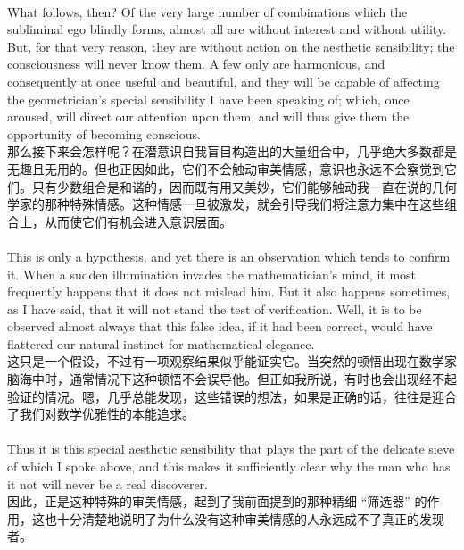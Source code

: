 \documentclass{article}
\begin{document}
\\
What follows, then? Of the very large number of combinations which the subliminal ego blindly forms, almost all are without interest and without utility. But, for that very reason, they are without action on the aesthetic sensibility; the consciousness will never know them. A few only are harmonious, and consequently at once useful and beautiful, and they will be capable of affecting the geometrician’s special sensibility I have been speaking of; which, once aroused, will direct our attention upon them, and will thus give them the opportunity of becoming conscious.\\
那么接下来会怎样呢？在潜意识自我盲目构造出的大量组合中，几乎绝大多数都是无趣且无用的。但也正因如此，它们不会触动审美情感，意识也永远不会察觉到它们。只有少数组合是和谐的，因而既有用又美妙，它们能够触动我一直在说的几何学家的那种特殊情感。这种情感一旦被激发，就会引导我们将注意力集中在这些组合上，从而使它们有机会进入意识层面。\\ 

\\
This is only a hypothesis, and yet there is an observation which tends to confirm it. When a sudden illumination invades the mathematician’s mind, it most frequently happens that it does not mislead him. But it also happens sometimes, as I have said, that it will not stand the test of verification. Well, it is to be observed almost always that this false idea, if it had been correct, would have flattered our natural instinct for mathematical elegance.\\
这只是一个假设，不过有一项观察结果似乎能证实它。当突然的顿悟出现在数学家脑海中时，通常情况下这种顿悟不会误导他。但正如我所说，有时也会出现经不起验证的情况。嗯，几乎总能发现，这些错误的想法，如果是正确的话，往往是迎合了我们对数学优雅性的本能追求。 \\ 

\\
Thus it is this special aesthetic sensibility that plays the part of the delicate sieve of which I spoke above, and this makes it sufficiently clear why the man who has it not will never be a real discoverer.\\
因此，正是这种特殊的审美情感，起到了我前面提到的那种精细 “筛选器” 的作用，这也十分清楚地说明了为什么没有这种审美情感的人永远成不了真正的发现者。 \\ 
\end{document}
